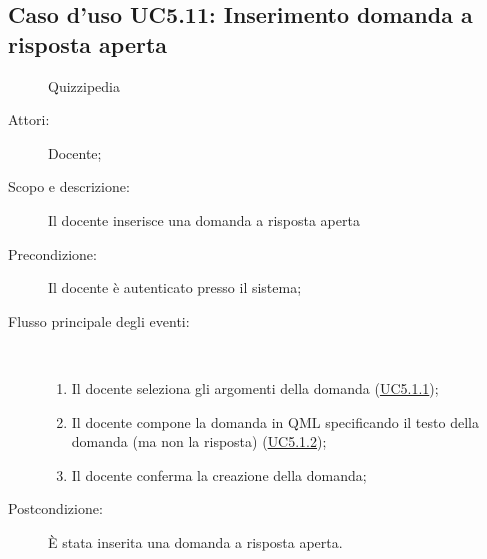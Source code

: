 \subsection{Caso d'uso UC5.11: Inserimento domanda a risposta aperta}
	\begin{figure}[H]
		\centering
		\begin{resizedtikzpicture}{\textwidth}
		\begin{umlsystem}[x=0, fill=lightgray!20]{Quizzipedia}
		\end{umlsystem}
		\end{resizedtikzpicture}
		\caption{}
	\end{figure}
\begin{description}
\item[Attori:] Docente;
\item[Scopo e descrizione:] Il docente inserisce una domanda a risposta aperta
      \item[Precondizione:] Il docente è autenticato presso il sistema;

        \item[Flusso principale degli eventi:] \ 
 \begin{enumerate}
          \item Il docente seleziona gli argomenti della domanda (\hyperlink{UC5.1.1}{UC5.1.1});
          \item Il docente compone la domanda in QML specificando il testo della domanda (ma non la risposta) (\hyperlink{UC5.1.2}{UC5.1.2});
          \item Il docente conferma la creazione della domanda;

      \end{enumerate}
    \item[Postcondizione:] È stata inserita una domanda a risposta aperta.
  \end{description}
\hypertarget{UC5.12}{}
